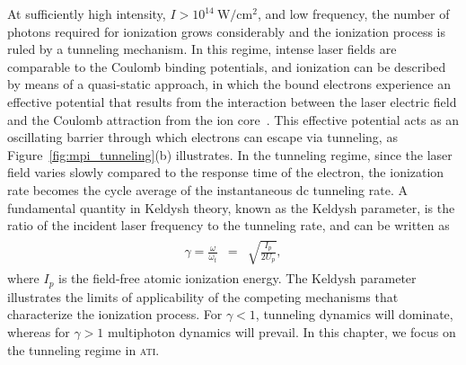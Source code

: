 At sufficiently high intensity, $I > 10^{14}\ \mathrm{W/cm^2}$, and
low frequency, the number of photons required for ionization grows
considerably and the ionization process is ruled by a tunneling
mechanism. In this regime, intense laser fields are comparable to the
Coulomb binding potentials, and ionization can be described by means
of a quasi-static approach, in which the bound electrons experience an
effective potential that results from the interaction between the
laser electric field and the Coulomb attraction from the ion
core~\cite{KeldyshSFA}. This effective potential acts as an
oscillating barrier through which electrons can escape via tunneling,
as Figure~\ref{fig:mpi_tunneling}(b) illustrates. In the tunneling
regime, since the laser field varies slowly compared to the response
time of the electron, the ionization rate becomes the cycle average of
the instantaneous dc tunneling rate. A fundamental quantity in Keldysh
theory, known as the Keldysh parameter, is the ratio of the incident
laser frequency to the tunneling rate, and can be written
as~\cite{KeldyshSFA}
%
\begin{eqnarray}
\begin{split}
\gamma = \frac{\omega}{\omega_{t}} & = & \sqrt{\frac{I_{p}}{2 U_{p}}},
\end{split}
\end{eqnarray}
%
where $I_{p}$ is the field-free atomic ionization energy. The Keldysh
parameter illustrates the limits of applicability of the competing
mechanisms that characterize the ionization process. For $\gamma < 1$,
tunneling dynamics will dominate, whereas for $\gamma > 1$ multiphoton
dynamics will prevail. In this chapter, we focus on the tunneling
regime in \textsc{ati}.

